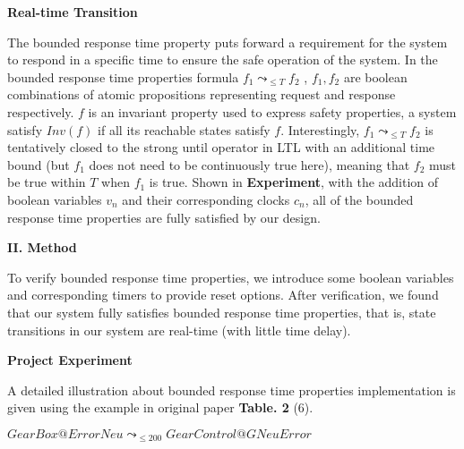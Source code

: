 \documentclass[a4paper]{article}
\begin{document}
\vspace{2mm}
\begin{center}
\large\textbf{Real-time Transition} \\
\end{center}

\large{
The bounded response time property puts forward a requirement for the system to respond in a specific time to ensure the safe operation of the system. In the bounded response time properties formula $f_1 \leadsto_{\le T} f_2$ , $ f_1, f_2$ are boolean combinations of atomic propositions representing request and response respectively. $f$ is an invariant property used to express safety properties, a system satisfy $Inv(f)$ if all its reachable states satisfy $f$. Interestingly, $f_1 \leadsto_{\le T} f_2$ is tentatively closed to the strong until operator in \normalsize{LTL }\large with an additional time bound (but $f_1$ does not need to be continuously true here), meaning that $f_2$ must be true within $T$ when $f_1$ is true. Shown in \normalsize{\textbf{Experiment}}\large, with the addition of boolean variables $v_n$ and their corresponding clocks $c_n$, all of the bounded response time properties are fully satisfied by our design.}


\vspace{5mm}
\begin{center}
\LARGE\textbf{II. Method} \\
\end{center}
\vspace{2mm}




\large{
To verify bounded response time properties, we introduce some boolean variables and corresponding timers to provide reset options. After verification, we found that our system fully satisfies bounded response time properties, that is, state transitions in our system are real-time (with little time delay).}

\vspace{2mm}
\begin{center}
\large\textbf{Project Experiment} \\
\end{center}

\large{
A detailed illustration about bounded response time properties implementation is given using the example in original paper \textbf{Table. 2} (6).}

\begin{center}
    $GearBox@ErrorNeu \leadsto _{\le 200}GearControl@GNeuError$
\end{center}
\end{document}

